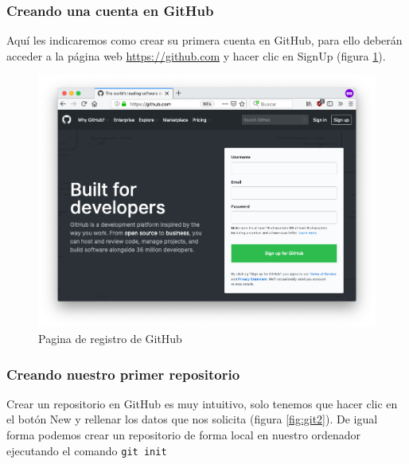 \subsubsection{Creando una cuenta en GitHub}

Aquí les indicaremos como crear su primera cuenta en GitHub, para ello deberán acceder a la página web \url{https://github.com} y hacer clic en SignUp (figura \ref{fig:git1}).

\begin{figure}[H]
\centering
\includegraphics[width=1.0\textwidth]{../images/git1}
\caption{Pagina de registro de GitHub}
\label{fig:git1}
\end{figure}

\subsubsection{Creando nuestro primer repositorio}

Crear un repositorio en GitHub es muy intuitivo, solo tenemos que hacer clic en el botón New y rellenar los datos que nos solicita (figura \ref{fig:git2}). De igual forma podemos crear un repositorio de forma local en nuestro ordenador ejecutando el comando \texttt{git init}


